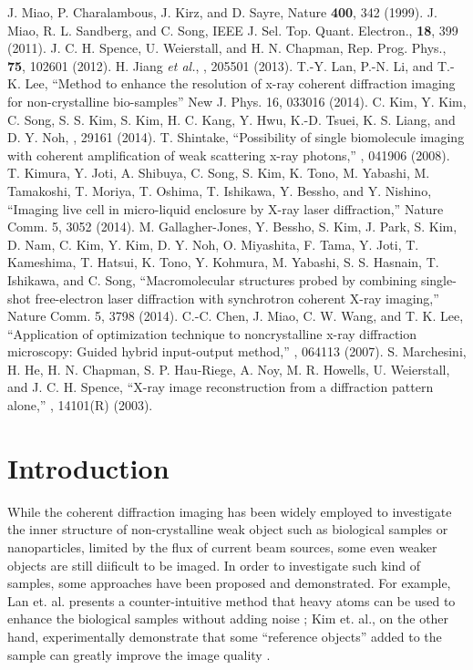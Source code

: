 \documentclass[10pt,letterpaper]{article}
\begin{document}
\begin{thebibliography}{10}
 J. Miao, P. Charalambous, J. Kirz, and D. Sayre, Nature {\bf 400}, 342 (1999).
 J. Miao, R. L. Sandberg, and C. Song, IEEE J. Sel. Top. Quant. Electron., {\bf 18}, 399 (2011).
 J. C. H. Spence, U. Weierstall, and H. N. Chapman, Rep. Prog. Phys., {\bf 75}, 102601 (2012).
 H. Jiang {\it et al.}, , 205501 (2013).
 T.-Y. Lan, P.-N. Li, and T.-K. Lee, ``Method to enhance the resolution of x-ray coherent diffraction imaging for non-crystalline bio-samples'' New J. Phys. 16, 033016 (2014).
 C. Kim, Y. Kim, C. Song, S. S. Kim, S. Kim, H. C. Kang, Y. Hwu, K.-D. Tsuei, K. S. Liang, and D. Y. Noh, , 29161 (2014).
 T. Shintake, ``Possibility of single biomolecule imaging with coherent amplification of weak scattering x-ray photons,'' , 041906 (2008).
 T. Kimura, Y. Joti, A. Shibuya, C. Song, S. Kim, K. Tono, M. Yabashi, M. Tamakoshi, T. Moriya, T. Oshima, T. Ishikawa, Y. Bessho, and Y. Nishino, ``Imaging live cell in micro-liquid enclosure by X-ray laser diffraction,'' Nature Comm. 5, 3052 (2014).
 M. Gallagher-Jones, Y. Bessho, S. Kim, J. Park, S. Kim, D. Nam, C. Kim, Y. Kim, D. Y. Noh, O. Miyashita, F. Tama, Y. Joti, T. Kameshima, T. Hatsui, K. Tono, Y. Kohmura, M. Yabashi, S. S. Hasnain, T. Ishikawa, and C. Song, ``Macromolecular structures probed by combining single-shot free-electron laser diffraction with synchrotron coherent X-ray imaging,'' Nature Comm. 5, 3798 (2014).
 C.-C. Chen, J. Miao, C. W. Wang, and T. K. Lee, ``Application of optimization technique to noncrystalline x-ray diffraction microscopy: Guided hybrid input-output method,'' , 064113 (2007).
 S. Marchesini, H. He, H. N. Chapman, S. P. Hau-Riege, A. Noy, M. R. Howells, U. Weierstall, and J. C. H. Spence, ``X-ray image reconstruction from a diffraction pattern alone,'' , 14101(R) (2003).
\end{thebibliography}

\section{Introduction}
While the coherent diffraction imaging \cite{ first-CDI, XCDI, dyn-bio, molten-iron} has been widely employed to investigate the inner structure of non-crystalline weak object such as biological samples or nanoparticles, limited by the flux of current beam sources, some even weaker objects are still diificult to be imaged. 
In order to investigate such kind of samples, some approaches have been proposed and demonstrated. For example, Lan et. al. presents a counter-intuitive method that heavy atoms can be used to enhance the biological samples without adding noise \cite{template}; Kim et. al., on the other hand, experimentally demonstrate that some ``reference objects'' added to the sample can greatly improve the image quality \cite{ref-obj}. 
\end{document}
